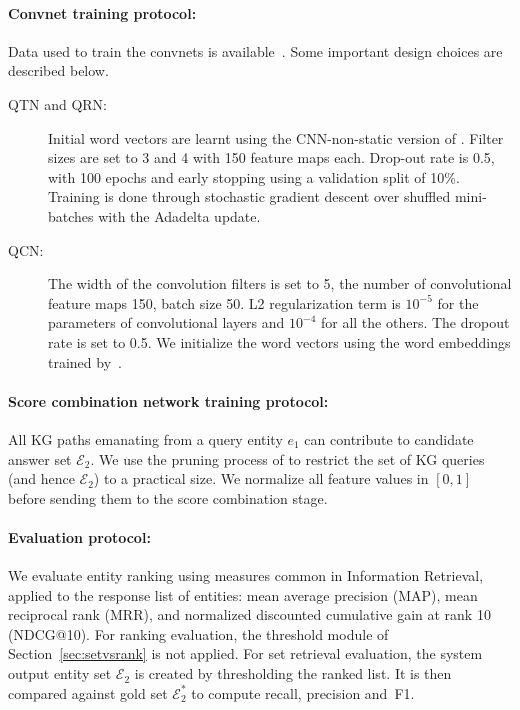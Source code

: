 \documentclass{svjour3}
\begin{document}
\paragraph{Convnet training protocol:}
Data used to train the convnets is available~\citep{CsawProject}.  Some important design choices are described below.
\begin{description}
\item[QTN and QRN:] Initial word
  vectors are learnt using the CNN-non-static version of
  \cite{Kim2014ConvnetSentence}. Filter sizes are set to 3 and 4 with 150 feature maps each. Drop-out rate is 0.5, with 100 epochs and early stopping
  using a validation split of 10\%. Training is done through
  stochastic gradient descent over shuffled mini-batches with the
  Adadelta update.

\item[QCN:] The width of the convolution filters is set to 5, the
  number of convolutional feature maps 150, batch size 50.
   L2 regularization term is $10^{-5}$ for the parameters of
  convolutional layers and $10^{-4}$ for all the others. The dropout
  rate is set to 0.5. We initialize the word vectors using the word
  embeddings trained by~\cite{Huang:2012}.
\end{description}

\paragraph{Score combination network training protocol:}
All KG paths emanating from a query entity $e_1$ can contribute to
candidate answer set $\mathcal{E}_2$.  We use the pruning process of
\citep{BastH2015aqqu} to restrict the set of KG queries (and hence
$\mathcal{E}_2$) to a practical size.  We normalize all feature values in $[0,1]$ before
sending them to the score combination stage.

\paragraph{Evaluation protocol:}
We evaluate entity ranking using measures common in Information
Retrieval, applied to the response list of entities: mean average
precision (MAP), mean reciprocal rank (MRR), and normalized discounted
cumulative gain at rank 10 (NDCG@10).  For ranking evaluation, the threshold module of Section~\ref{sec:setvsrank} is not applied.  For set retrieval evaluation, the system output entity set $\mathcal{E}_2$ is created by thresholding the ranked list.  It is then compared against gold set $\mathcal{E}^*_2$ to compute recall, precision and~F1. 
\end{document}
